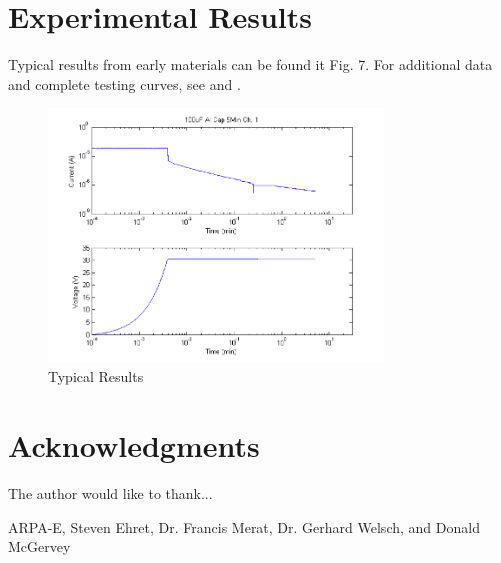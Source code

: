\documentclass[journal]{IEEEtran}
\begin{document}
\section{Experimental Results}
Typical results from early materials can be found it Fig. 7. For additional data and complete testing curves, see \cite{sThesis} and \cite{mThesis}.


\begin{figure}[here]
\centering
\includegraphics[width=3.5in]{measData}
\caption{Typical Results}
\label{fig:measData}
\end{figure}

\section*{Acknowledgments}

The author would like to thank...

ARPA-E,
Steven Ehret,
Dr. Francis Merat,
Dr. Gerhard Welsch,
and Donald McGervey

\ifCLASSOPTIONcaptionsoff
\newpage
\fi
\end{document}
